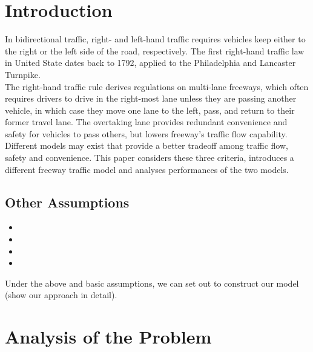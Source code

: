 

\section{Introduction}

In bidirectional traffic, right- and left-hand traffic requires 
vehicles keep either to the right or the left side of the road, 
respectively.\cite{Draper_Geoff_1993} The first right-hand 
traffic law in United State dates back to 1792, applied to the 
Philadelphia and Lancaster Turnpike.\cite{Weingroff_Richard_2014}\\

The right-hand traffic rule derives regulations on multi-lane 
freeways, which often requires drivers to drive in the 
right-most lane unless they are passing another vehicle, in 
which case they move one lane to the left, pass, and return 
to their former travel lane. The overtaking lane provides 
redundant convenience and safety for vehicles to pass others, 
but lowers freeway's traffic flow capability.\\

Different models may exist that provide a better tradeoff 
among traffic flow, safety and convenience. This paper 
considers these three criteria, introduces a different 
freeway traffic model and analyses performances of the two 
models.


\subsection{Other Assumptions}

\begin{itemize}
\item
\item
\item
\item
\end{itemize}

 Under the above and basic assumptions, we can set out
to construct our model (show our approach in detail).



\section{Analysis of the Problem }

